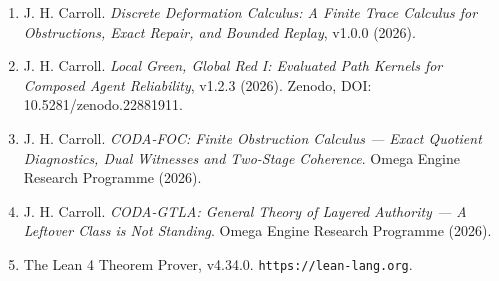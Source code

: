 \documentclass[
  11pt,
]{article}
\providecommand{\tightlist}{%
  \setlength{\itemsep}{0pt}\setlength{\parskip}{0pt}}
\renewcommand{\_}{\origunderscore\allowbreak}
\begin{document}
\begin{enumerate}
\def\labelenumi{\arabic{enumi}.}
\tightlist
\item
  J. H. Carroll. \emph{Discrete Deformation Calculus: A Finite Trace
  Calculus for Obstructions, Exact Repair, and Bounded Replay}, v1.0.0
  (2026).
\item
  J. H. Carroll. \emph{Local Green, Global Red I: Evaluated Path Kernels
  for Composed Agent Reliability}, v1.2.3 (2026). Zenodo, DOI:
  10.5281/zenodo.22881911.
\item
  J. H. Carroll. \emph{CODA-FOC: Finite Obstruction Calculus --- Exact
  Quotient Diagnostics, Dual Witnesses and Two-Stage Coherence}. Omega
  Engine Research Programme (2026).
\item
  J. H. Carroll. \emph{CODA-GTLA: General Theory of Layered Authority
  --- A Leftover Class is Not Standing}. Omega Engine Research Programme
  (2026).
\item
  The Lean 4 Theorem Prover, v4.34.0. \texttt{https://lean-lang.org}.
\end{enumerate}
\end{document}

